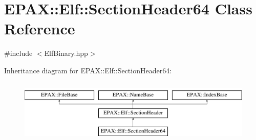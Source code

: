 \hypertarget{class_e_p_a_x_1_1_elf_1_1_section_header64}{\section{\-E\-P\-A\-X\-:\-:\-Elf\-:\-:\-Section\-Header64 \-Class \-Reference}
\label{class_e_p_a_x_1_1_elf_1_1_section_header64}
}


{\ttfamily \#include $<$\-Elf\-Binary.\-hpp$>$}

\-Inheritance diagram for \-E\-P\-A\-X\-:\-:\-Elf\-:\-:\-Section\-Header64\-:\begin{figure}[H]
\begin{center}
\leavevmode
\includegraphics[height=3.000000cm]{class_e_p_a_x_1_1_elf_1_1_section_header64}
\end{center}
\end{figure}
